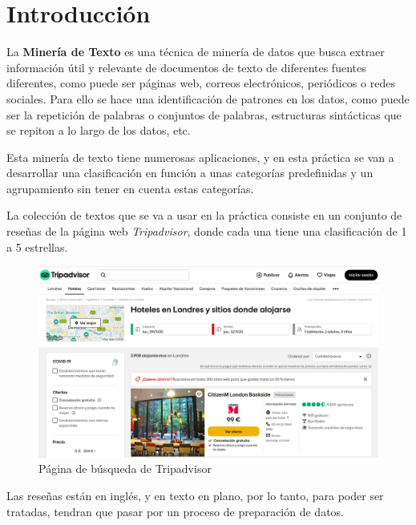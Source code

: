 \documentclass[12pt,a4paper, xcolor=table]{article}
\begin{document}
\section{Introducción}

    La \textbf{Minería de Texto} es una técnica de minería de datos que busca extraer información útil y relevante de documentos de texto de diferentes fuentes diferentes, como puede ser páginas web, correos electrónicos, periódicos o redes sociales. Para ello se hace una identificación de patrones en los datos, como puede ser la repetición de palabras o conjuntos de palabras, estructuras sintácticas que se repiton a lo largo de los datos, etc.

    \vspace{3mm}

    Esta minería de texto tiene numerosas aplicaciones, y en esta práctica se van a desarrollar una clasificación en función a unas categorías predefinidas y un agrupamiento sin tener en cuenta estas categorías.

    \vspace{2mm}

    La colección de textos que se va a usar en la práctica consiste en un conjunto de reseñas de la página web \textit{Tripadvisor}, donde cada una tiene una clasificación de 1 a 5 estrellas.

    \begin{figure}[!h]
      \centering
      \includegraphics[width=14cm]{img/tripadvisor-main.png}
      \caption{Página de búsqueda de Tripadvisor}
    \end{figure}

    Las reseñas están en inglés, y en texto en plano, por lo tanto, para poder ser tratadas, tendran que pasar por un proceso de preparación de datos.
\end{document}
